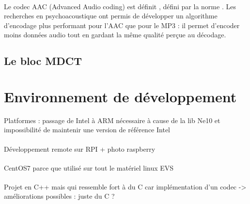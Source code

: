 \documentclass{article}
\begin{document}
    \paragraph{}
    Le codec AAC (Advanced Audio coding) est définit  , défini par la norme . Les recherches en psychoacoustique ont permis de développer un algorithme d'encodage plus performant pour l'AAC que pour le MP3 : il permet d'encoder moins données audio tout en gardant la même qualité perçue au décodage\cite{1999-Brandenburg}.



    \subsection{Le bloc MDCT}


    \newpage
    \section{Environnement de développement}
    \paragraph{}
    Platformes : passage de Intel à ARM nécessaire à cause de la lib Ne10 et impossibilité de maintenir une version de référence Intel

    \paragraph{}
    Développement remote sur RPI + photo raspberry

    \paragraph{}
    CentOS7 parce que utilisé sur tout le matériel linux EVS

    \paragraph{}
    Projet en C++ mais qui ressemble fort à du C car implémentation d'un codec -> améliorations possibles : juste du C ?
\end{document}

